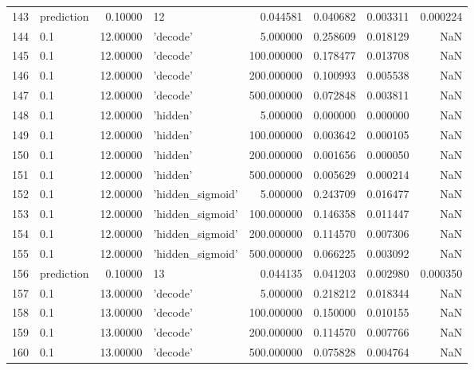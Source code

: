 \documentclass[10pt,a4paper]{article}
\begin{document}
\begin{tabular}{llrlrrrr}
143  &  prediction &   0.10000 &                 12 &    0.044581 &  0.040682 &  0.003311 &  0.000224 \\
144  &         0.1 &  12.00000 &           'decode' &    5.000000 &  0.258609 &  0.018129 &       NaN \\
145  &         0.1 &  12.00000 &           'decode' &  100.000000 &  0.178477 &  0.013708 &       NaN \\
146  &         0.1 &  12.00000 &           'decode' &  200.000000 &  0.100993 &  0.005538 &       NaN \\
147  &         0.1 &  12.00000 &           'decode' &  500.000000 &  0.072848 &  0.003811 &       NaN \\
148  &         0.1 &  12.00000 &           'hidden' &    5.000000 &  0.000000 &  0.000000 &       NaN \\
149  &         0.1 &  12.00000 &           'hidden' &  100.000000 &  0.003642 &  0.000105 &       NaN \\
150  &         0.1 &  12.00000 &           'hidden' &  200.000000 &  0.001656 &  0.000050 &       NaN \\
151  &         0.1 &  12.00000 &           'hidden' &  500.000000 &  0.005629 &  0.000214 &       NaN \\
152  &         0.1 &  12.00000 &   'hidden\_sigmoid' &    5.000000 &  0.243709 &  0.016477 &       NaN \\
153  &         0.1 &  12.00000 &   'hidden\_sigmoid' &  100.000000 &  0.146358 &  0.011447 &       NaN \\
154  &         0.1 &  12.00000 &   'hidden\_sigmoid' &  200.000000 &  0.114570 &  0.007306 &       NaN \\
155  &         0.1 &  12.00000 &   'hidden\_sigmoid' &  500.000000 &  0.066225 &  0.003092 &       NaN \\
156  &  prediction &   0.10000 &                 13 &    0.044135 &  0.041203 &  0.002980 &  0.000350 \\
157  &         0.1 &  13.00000 &           'decode' &    5.000000 &  0.218212 &  0.018344 &       NaN \\
158  &         0.1 &  13.00000 &           'decode' &  100.000000 &  0.150000 &  0.010155 &       NaN \\
159  &         0.1 &  13.00000 &           'decode' &  200.000000 &  0.114570 &  0.007766 &       NaN \\
160  &         0.1 &  13.00000 &           'decode' &  500.000000 &  0.075828 &  0.004764 &       NaN \\

\end{tabular}
\end{document}
